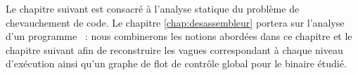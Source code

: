 Le chapitre suivant est consacré à l'analyse statique du problème de chevauchement de code.
Le chapitre \ref{chap:desassembleur} portera sur l'analyse d'un programme \sm\ : nous combinerons les notions abordées dans ce chapitre et le chapitre suivant afin de reconstruire les vagues correspondant à chaque niveau d'exécution ainsi qu'un graphe de flot de contrôle global pour le binaire étudié.
